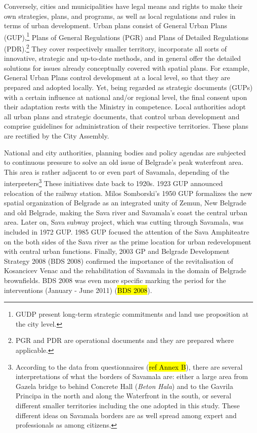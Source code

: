 \documentclass[11pt]{report}
\begin{document}
\begin{itemize}
Conversely, cities and municipalities have legal means and rights to make their own strategies, plans, and programs, as well as local regulations and rules in terms of urban development.
Urban plans consist of General Urban Plans (GUP),\footnote{GUDP present long-term strategic commitments and land use proposition at the city level.} Plans of General Regulations (PGR) and Plans of Detailed Regulations (PDR).\footnote{PGR and PDR are operational documents and they are prepared where applicable.}
They cover respectively smaller territory, incorporate all sorts of innovative, strategic and up-to-date methods, and in general offer the detailed solutions for issues already conceptually covered with spatial plans.
For example, General Urban Plans control development at a local level, so that they are prepared and adopted locally.
Yet, being regarded as strategic documents (GUPs) with a certain influence at national and/or regional level, the final consent upon their adaptation rests with the Ministry in competence.
Local authorities adopt all urban plans and strategic documents, that control urban development and comprise guidelines for administration of their respective territories.
These plans are rectified by the City Assembly.

National and city authorities, planning bodies and policy agendas are subjected to continuous pressure to solve an old issue of Belgrade’s peak waterfront area.
This area is rather adjacent to or even part of Savamala, depending of the interpreters\footnote{According to the data from questionnaires (\hl{ref Annex B}), there are several interpretations of what the borders of Savamala are: either a large area from Gazela bridge to behind Concrete Hall (\textit{Beton Hala}) and to the Gavrila Principa in the north and along the Waterfront in the south, or several different smaller territories including the one adopted in this study. These different ideas on Savamala borders are as well spread among expert and professionals as among citizens.}
These initiatives date back to 1920s.
1923 GUP announced relocation of the railway station.
Milos Somborski's 1950 GUP formalizes the new spatial organization of Belgrade as an integrated unity of Zemun, New Belgrade and old Belgrade, making the Sava river and Savamala's coast the central urban area.
Later on, Sava subway project, which was cutting through Savamala, was included in 1972 GUP.
1985 GUP focused the attention of the Sava Amphiteatre on the both sides of the Sava river as the prime location for urban redevelopment with central urban functions.
Finally, 2003 GP and Belgrade Development Strategy 2008 (BDS 2008) confirmed the importance of the revitalisation of Kosancicev Venac and the rehabilitation of Savamala in the domain of Belgrade brownfields. BDS 2008 was even more specific marking the period for the interventions (January - June 2011) (\hl{BDS 2008}).
\\


\end{itemize}
\end{document}
